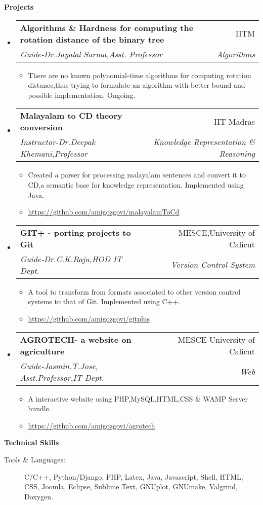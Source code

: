 \documentclass[A4paper,11pt]{article}
\makeatletter
\newcommand{\resitem}[1]{\item #1 \vspace{-2pt}}
\newcommand{\resheading}[1]{{\large \colorbox{mygrey}{\begin{minipage}{\textwidth}{\textbf{#1 \vphantom{p\^{E}}}}\end{minipage}}}}
\newcommand{\ressubheading}[4]{
\begin{tabular*}{6.5in}{l@{\extracolsep{\fill}}r}
		\textbf{#1} & #2 \\
		\textit{#3} & \textit{#4} \\
\end{tabular*}\vspace{-6pt}}
\makeatother
\begin{document}
\resheading{Projects}
\begin{itemize}

\item
	\ressubheading{Algorithms \& Hardness for computing the rotation distance of the binary tree}{IITM}{Guide-Dr.Jayalal Sarma,Asst. Professor}{Algorithms}
	\begin{itemize}
		\item{There are no known polynomial-time algorithms for computing rotation distance,thus trying to formulate an algorithm with better bound and possible implementation. Ongoing.}
	\end{itemize}
	
\item	
	\ressubheading{Malayalam to CD theory conversion}{IIT Madras}{Instructor-Dr.Deepak Khemani,Professor}{Knowledge Representation \& Reasoning}
	\begin{itemize}
		\item{Created a parser for processing malayalam sentences and convert it to CD,a semantic base for knowledge representation. Implemented using Java.}
		\resitem{\url{https://github.com/amigozgovi/malayalamToCd}}
	\end{itemize}
	
\item	
	\ressubheading{GIT+ - porting projects to Git}{MESCE,University of Calicut}{Guide-Dr.C.K.Raju,HOD IT Dept.}{Version Control System}
	\begin{itemize}
		\item{A tool to transform from formats associated to other version control systems to that of Git. Implemented using C++.}
		\resitem{\url{https://github.com/amigozgovi/gitplus}}
	\end{itemize}
	
\item	
	\ressubheading{AGROTECH- a website on agriculture}{MESCE-University of Calicut}{Guide-Jasmin.T.Jose, Asst.Professor,IT Dept.}{Web}
	\begin{itemize}
		\item{A interactive website using PHP,MySQL,HTML,CSS \& WAMP Server bundle.}
		\resitem{\url{https://github.com/amigozgovi/agrotech}}
	\end{itemize}
\end{itemize}

\resheading{Technical Skills}

\begin{description}
\item[Tools \& Languages:]  C/C++, Python/Django, PHP, Latex, Java, Javascript, Shell, HTML, CSS, Joomla, Eclipse, Sublime Text, GNUplot, GNUmake, Valgrind, Doxygen.
\end{description}
\end{document}
